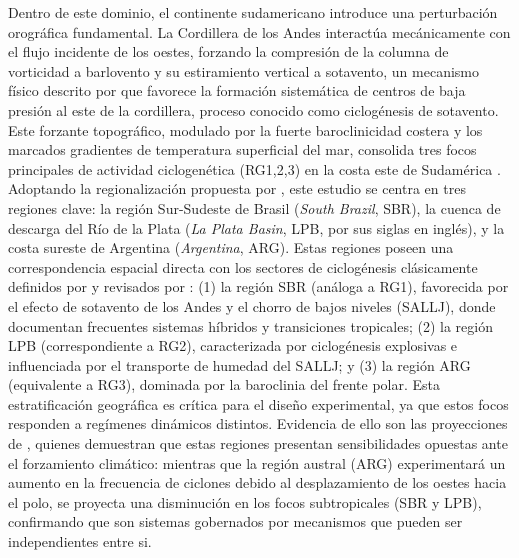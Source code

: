 Dentro de este dominio, el continente sudamericano introduce una perturbación orográfica fundamental. La Cordillera de los Andes interactúa mecánicamente con el flujo incidente de los oestes, forzando la compresión de la columna de vorticidad a barlovento y su estiramiento vertical a sotavento, un mecanismo físico descrito por \citet{gan1994influence} que favorece la formación sistemática de centros de baja presión al este de la cordillera, proceso conocido como ciclogénesis de sotavento.
Este forzante topográfico, modulado por la fuerte baroclinicidad costera y los marcados gradientes de temperatura superficial del mar, consolida tres focos principales de actividad ciclogenética (RG1,2,3) en la costa este de Sudamérica \citep{reboita2026meteorology}. Adoptando la regionalización propuesta por \citet{gramcianinov2019properties}, este estudio se centra en tres regiones clave: la región Sur-Sudeste de Brasil (\textit{South Brazil}, SBR), la cuenca de descarga del Río de la Plata (\textit{La Plata Basin}, LPB, por sus siglas en inglés), y la costa sureste de Argentina (\textit{Argentina}, ARG). Estas regiones poseen una correspondencia espacial directa con los sectores de ciclogénesis clásicamente definidos por \citet{reboita2010cyclones} y revisados por \citet{reboita2026meteorology}: (1) la región SBR (análoga a RG1), favorecida por el efecto de sotavento de los Andes y el chorro de bajos niveles (SALLJ), donde \citet{reboita2022from} documentan frecuentes sistemas híbridos y transiciones tropicales; (2) la región LPB (correspondiente a RG2), caracterizada por ciclogénesis explosivas e influenciada por el transporte de humedad del SALLJ; y (3) la región ARG (equivalente a RG3), dominada por la baroclinia del frente polar.
Esta estratificación geográfica es crítica para el diseño experimental, ya que estos focos responden a regímenes dinámicos distintos. Evidencia de ello son las proyecciones de \citet{dejesus2021multimodel}, quienes demuestran que estas regiones presentan sensibilidades opuestas ante el forzamiento climático: mientras que la región austral (ARG) experimentará un aumento en la frecuencia de ciclones debido al desplazamiento de los oestes hacia el polo, se proyecta una disminución en los focos subtropicales (SBR y LPB), confirmando que son sistemas gobernados por mecanismos que pueden ser independientes entre si.

